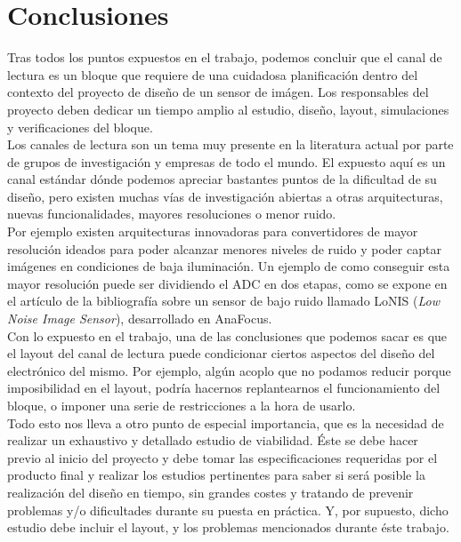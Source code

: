 \chapter{Conclusiones}

Tras todos los puntos expuestos en el trabajo, podemos concluir que el canal de
lectura es un bloque que requiere de una cuidadosa planificación dentro del
contexto del proyecto de diseño de un sensor de imágen. Los responsables del
proyecto deben dedicar un tiempo amplio al estudio, diseño, layout, simulaciones
y verificaciones del bloque.\\

Los canales de lectura son un tema muy presente en la literatura actual por parte
de grupos de investigación y empresas de todo el mundo. El expuesto aquí es un
canal estándar dónde podemos apreciar bastantes puntos de la dificultad de su
diseño, pero existen muchas vías de investigación abiertas a otras arquitecturas,
nuevas funcionalidades, mayores resoluciones o menor ruido.\\

Por ejemplo existen arquitecturas innovadoras para convertidores de mayor resolución
ideados para poder alcanzar menores niveles de ruido y poder captar imágenes en
condiciones de baja iluminación. Un ejemplo de como conseguir esta mayor resolución
puede ser dividiendo el ADC en dos etapas, como se expone en el artículo de la
bibliografía\cite{Gonzalez-Charlet2015:Low_noise} sobre un sensor de bajo ruido
llamado LoNIS (\textit{Low Noise Image Sensor}), desarrollado en AnaFocus\cite{anafocus}.\\

Con lo expuesto en el trabajo, una de las conclusiones que podemos sacar es que
el layout del canal de lectura puede condicionar ciertos aspectos del diseño del
electrónico del mismo. Por ejemplo, algún acoplo que no podamos reducir porque
imposibilidad en el layout, podría hacernos replantearnos el funcionamiento
del bloque, o imponer una serie de restricciones a la hora de usarlo.\\

Todo esto nos lleva a otro punto de especial importancia, que es la necesidad de
realizar un exhaustivo y detallado estudio de viabilidad. Éste se debe hacer
previo al inicio del proyecto y debe tomar las especificaciones requeridas por el
producto final y realizar los estudios pertinentes para saber si será posible la
realización del diseño en tiempo, sin grandes costes y tratando de prevenir problemas
y/o dificultades durante su puesta en práctica. Y, por supuesto, dicho estudio debe
incluir el layout, y los problemas mencionados durante éste trabajo.\\

